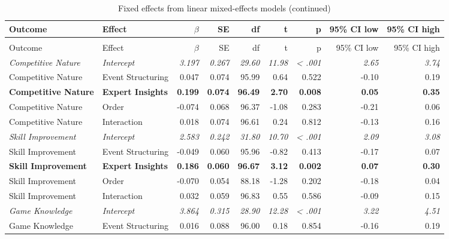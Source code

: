 \scriptsize
\begin{longtable}{l l r r r r r r r}
  \caption{\label{app:fixed_effects}Fixed effects from linear mixed-effects models (95\% confidence intervals)}\\
  \toprule
  Outcome & Effect & $\beta$ & SE & df & t & p & 95\% CI low & 95\% CI high\\
  \midrule
  \endfirsthead
  \caption[]{Fixed effects from linear mixed-effects models (continued)}\\
  \toprule
  Outcome & Effect & $\beta$ & SE & df & t & p & 95\% CI low & 95\% CI high\\
  \midrule
  \endhead
  \bottomrule
  \endlastfoot
  \textit{Competitive Nature} & \textit{Intercept} & \textit{3.197} & \textit{0.267} & \textit{29.60} & \textit{11.98} & \textit{< .001} & \textit{2.65} & \textit{3.74}\\*
  Competitive Nature & Event Structuring & 0.047 & 0.074 & 95.99 & 0.64 & 0.522 & -0.10 & 0.19\\*
  \textbf{Competitive Nature} & \textbf{Expert Insights} & \textbf{0.199} & \textbf{0.074} & \textbf{96.49} & \textbf{2.70} & \textbf{0.008} & \textbf{0.05} & \textbf{0.35}\\*
  Competitive Nature & Order & -0.074 & 0.068 & 96.37 & -1.08 & 0.283 & -0.21 & 0.06\\*
  Competitive Nature & Interaction & 0.018 & 0.074 & 96.61 & 0.24 & 0.812 & -0.13 & 0.16\\
  \addlinespace
  \textit{Skill Improvement} & \textit{Intercept} & \textit{2.583} & \textit{0.242} & \textit{31.80} & \textit{10.70} & \textit{< .001} & \textit{2.09} & \textit{3.08}\\*
  Skill Improvement & Event Structuring & -0.049 & 0.060 & 95.96 & -0.82 & 0.413 & -0.17 & 0.07\\*
  \textbf{Skill Improvement} & \textbf{Expert Insights} & \textbf{0.186} & \textbf{0.060} & \textbf{96.67} & \textbf{3.12} & \textbf{0.002} & \textbf{0.07} & \textbf{0.30}\\*
  Skill Improvement & Order & -0.070 & 0.054 & 88.18 & -1.28 & 0.202 & -0.18 & 0.04\\*
  Skill Improvement & Interaction & 0.032 & 0.059 & 96.83 & 0.55 & 0.586 & -0.09 & 0.15\\
  \addlinespace
  \textit{Game Knowledge} & \textit{Intercept} & \textit{3.864} & \textit{0.315} & \textit{28.90} & \textit{12.28} & \textit{< .001} & \textit{3.22} & \textit{4.51}\\*
  Game Knowledge & Event Structuring & 0.016 & 0.088 & 96.00 & 0.18 & 0.854 & -0.16 & 0.19\\*

\end{longtable}
